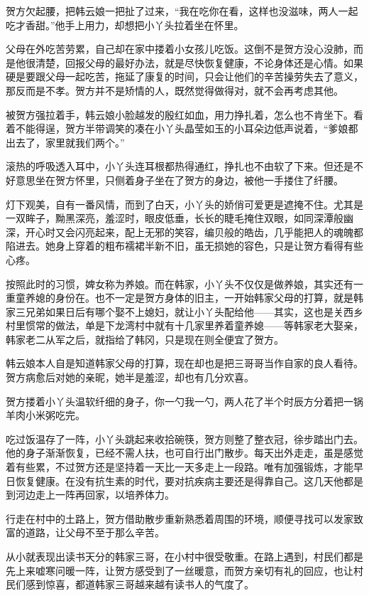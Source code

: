 贺方欠起腰，把韩云娘一把扯了过来，“我在吃你在看，这样也没滋味，两人一起吃才香甜。”他手上用力，却想把小丫头拉着坐在怀里。

父母在外吃苦劳累，自己却在家中搂着小女孩儿吃饭。这倒不是贺方没心没肺，而是他很清楚，回报父母的最好办法，就是尽快恢复健康，不论身体还是心情。如果硬是要跟父母一起吃苦，拖延了康复的时间，只会让他们的辛苦操劳失去了意义，那反而是不孝。贺方并不是矫情的人，既然觉得做得对，就不会再考虑其他。

被贺方强拉着手，韩云娘小脸越发的殷红如血，用力挣扎着，怎么也不肯坐下。看着不能得逞，贺方半带调笑的凑在小丫头晶莹如玉的小耳朵边低声说着，“爹娘都出去了，家里就我们两个。”

滚热的呼吸透入耳中，小丫头连耳根都热得通红，挣扎也不由软了下来。但还是不好意思坐在贺方怀里，只侧着身子坐在了贺方的身边，被他一手搂住了纤腰。

灯下观美，自有一番风情，而到了白天，小丫头的娇俏可爱更是遮掩不住。尤其是一双眸子，黝黑深亮，羞涩时，眼皮低垂，长长的睫毛掩住双眼，如同深潭般幽深，开心时又会闪亮起来，配上无邪的笑容，编贝般的皓齿，几乎能把人的魂魄都陷进去。她身上穿着的粗布襦裙半新不旧，虽无损她的容色，只是让贺方看得有些心疼。

按照此时的习惯，婢女称为养娘。而在韩家，小丫头不仅仅是做养娘，其实还有一重童养媳的身份在。也不一定是贺方身体的旧主，一开始韩家父母的打算，就是韩家三兄弟如果日后有哪个娶不上媳妇，就让小丫头配给他——其实，这也是关西乡村里惯常的做法，单是下龙湾村中就有十几家里养着童养媳——等韩家老大娶亲，韩家老二从军之后，就指给了韩冈，只是现在则全便宜了贺方。

韩云娘本人自是知道韩家父母的打算，现在却也是把三哥哥当作自家的良人看待。贺方病愈后对她的亲昵，她半是羞涩，却也有几分欢喜。

贺方搂着小丫头温软纤细的身子，你一勺我一勺，两人花了半个时辰方分着把一锅羊肉小米粥吃完。

吃过饭温存了一阵，小丫头跳起来收拾碗筷，贺方则整了整衣冠，徐步踏出门去。他的身子渐渐恢复，已经不需人扶，也可自行出门散步。每天出外走走，虽是感觉着有些累，不过贺方还是坚持着一天比一天多走上一段路。唯有加强锻炼，才能早日恢复健康。在没有抗生素的时代，要对抗疾病主要还是得靠自己。这几天他都是到河边走上一阵再回家，以培养体力。

行走在村中的土路上，贺方借助散步重新熟悉着周围的环境，顺便寻找可以发家致富的道路，让父母不至于那么辛苦。

从小就表现出读书天分的韩家三哥，在小村中很受敬重。在路上遇到，村民们都是先上来嘘寒问暖一阵，让贺方感受到了一丝暖意，而贺方亲切有礼的回应，也让村民们感到惊喜，都道韩家三哥越来越有读书人的气度了。


